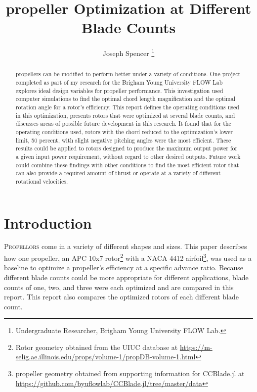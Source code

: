\documentclass[journal ]{new-aiaa}
\title{propeller Optimization at Different Blade Counts}
\author{Joseph Spencer \footnote{Undergraduate Researcher, Brigham Young University FLOW Lab.}}
\affil{Brigham Young University, Provo, Utah, 84601}
\begin{document}
\maketitle

\begin{abstract}

propellers can be modified to perform better under a variety of conditions. One project completed as part of my research for the Brigham Young University FLOW Lab explores ideal design variables for propeller performance. This investigation used computer simulations to find the optimal chord length magnification and the optimal rotation angle for a rotor's efficiency. This report defines the operating conditions used in this optimization, presents rotors that were optimized at several blade counts, and discusses areas of possible future development in this research. It found that for the operating conditions used, rotors with the chord reduced to the optimization's lower limit, 50 percent, with slight negative pitching angles were the most efficient. These results could be applied to rotors designed to produce the maximum output power for a given input power requirement, without regard to other desired outputs. Future work could combine these findings with other conditions to find the most efficient rotor that can also provide a required amount of thrust or operate at a variety of different rotational velocities.

\end{abstract}


\section{Introduction}

\lettrine{P}{ropellors} come in a variety of different shapes and sizes. This paper describes how one propeller, an APC 10x7 rotor\footnote{Rotor geometry obtained from the UIUC database at \url{https://m-selig.ae.illinois.edu/props/volume-1/propDB-volume-1.html}} with a NACA 4412 airfoil\footnote{propeller geometry obtained from supporting information for CCBlade.jl at \url{https://github.com/byuflowlab/CCBlade.jl/tree/master/data}}, was used as a baseline to optimize a propeller's efficiency at a specific advance ratio. Because different blade counts could be more appropriate for different applications, blade counts of one, two, and three were each optimized and are compared in this report. This report also compares the optimized rotors of each different blade count.
\end{document}
